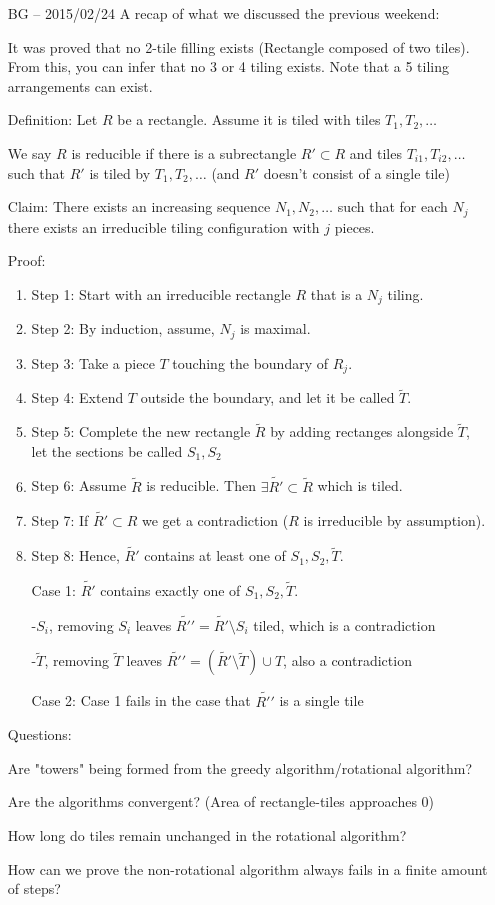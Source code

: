 \documentclass[11pt]{article}
\theoremstyle{plain}%
\theoremstyle{definition}
\theoremstyle{remark}
\numberwithin{equation}{section}
\begin{document}
\begin{itemize}
\item[BG -- 2015/02/24]
A recap of what we discussed the previous weekend:

It was proved that no 2-tile filling exists (Rectangle composed of two tiles). From this, you can infer that no 3 or 4 tiling exists. Note that a 5 tiling arrangements can exist.

Definition: Let $R$ be a rectangle. Assume it is tiled with tiles $T_1, T_2,\ldots$

We say $R$ is reducible if there is a subrectangle $R\prime\subset R$ and tiles  $T_{i1}, T_{i2},\ldots$ such that $R\prime $ is tiled by $T_1, T_2,\ldots$ (and $R\prime$ doesn't consist of a single tile)

Claim: There exists an increasing sequence $N_1, N_2, \ldots$ such that for each $N_j$ there exists an irreducible tiling configuration with $j$ pieces.

Proof:
\begin{enumerate}
\item Step 1: Start with an irreducible rectangle $R$ that is a $N_j$ tiling.
\item Step 2: By induction, assume, $N_j$ is maximal.
\item Step 3: Take a piece $T$ touching the boundary of $R_j$.
\item Step 4: Extend $T$ outside the boundary, and let it be called $\tilde{T}$.
\item Step 5: Complete the new rectangle $\tilde{R}$ by adding rectanges alongside $\tilde{T}$, let the sections be called $S_1, S_2$
\item Step 6: Assume $\tilde{R}$ is reducible. Then $\exists  \tilde{R\prime}\subset \tilde{R}$ which is tiled.
\item Step 7: If $\tilde{R\prime}\subset R$ we get a contradiction ($R$ is irreducible by assumption).
\item Step 8: Hence, $\tilde{R\prime}$ contains at least one of $S_1, S_2, \tilde{T}$.


Case 1: $\tilde{R\prime}$ contains exactly one of $S_1, S_2, \tilde{T}$. 

-$S_i$, removing $S_i$ leaves $\tilde{R\prime \prime}=\tilde{R\prime}\setminus S_i$ tiled, which is a contradiction

-$\tilde{T}$, removing $\tilde{T}$ leaves $\tilde{R\prime \prime}=(\tilde{R\prime}\setminus \tilde{T})\cup T$, also a contradiction


Case 2: Case 1 fails in the case that $\tilde{R\prime \prime}$ is a single tile

\end {enumerate}

Questions:

Are "towers" being formed from the greedy algorithm/rotational algorithm?

Are the algorithms convergent? (Area of rectangle-tiles approaches 0)

How long do tiles remain unchanged in the rotational algorithm?

How can we prove the non-rotational algorithm always fails in a finite amount of steps?
\end {itemize}
\end{document}

